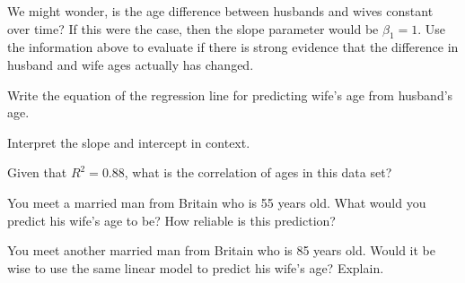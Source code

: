 {\begin{parts}
\item We might wonder, is the age difference between husbands and wives constant over time? If this were the case, then the slope parameter would be $\beta_1 = 1$. Use the information above to evaluate if there is strong evidence that the difference in husband and wife ages actually has changed.
\item Write the equation of the regression line for predicting wife's age from husband's age.
\item Interpret the slope and intercept in context.
\item Given that $R^2 = 0.88$, what is the correlation of ages  in this data set?
\item You meet a married man from Britain who is 55 years old. What would you predict his wife's age to be? How reliable is this prediction?
\item You meet another married man from Britain who is 85 years old. Would it be wise to use the same linear model to predict his wife's age? Explain.
\end{parts}
}{}

\textB{\newpage}


